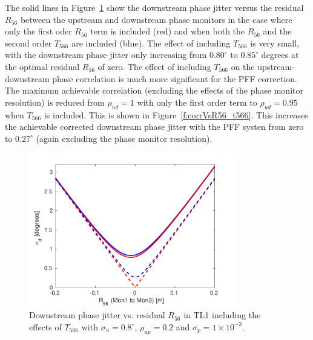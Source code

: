 The solid lines in Figure~\ref{f:jitVsR56_t566} show the downstream phase jitter versus the residual \(R_{56}\) between the upstream and downstream phase monitors in the case where only the first oder \(R_{56}\) term is included (red) and when both the \(R_{56}\) and the second order \(T_{566}\) are included (blue). The effect of including \(T_{566}\) is very small, with the downstream phase jitter only increasing from \(0.80^\circ\) to \(0.85^\circ\) degrees at the optimal residual \(R_{56}\) of zero. The effect of including \(T_{566}\) on the upstream-downstream phase correlation is much more significant for the PFF correction. The maximum achievable correlation (excluding the effects of the phase monitor resolution) is reduced from \(\rho_{ud} = 1\) with only the first order term to \(\rho_{ud} = 0.95\) when \(T_{566}\) is included. This is shown in Figure~\ref{f:corrVsR56_t566}.  This increases the achievable corrected downstream phase jitter with the PFF systen from zero to \(0.27^\circ\) (again excluding the phase monitor resolution). 

\begin{figure}
  \centering
  \includegraphics[width=0.8\textwidth]{Figures/propagation/jitVsR56_t566}
  \caption{Downstream phase jitter vs. residual \(R_{56}\) in TL1 including the effects of \(T_{566}\) with \(\sigma_u = 0.8^\circ\), \(\rho_{up}=0.2\) and \(\sigma_p = 1 \times 10^{-3}\).}
  \label{f:jitVsR56_t566}
\end{figure}

